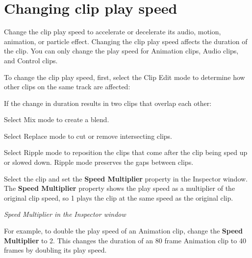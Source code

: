 \chapter{Changing clip play speed}
\hypertarget{md__library_2_package_cache_2com_8unity_8timeline_0d1_87_86_2_documentation_0i_2clp__speed}{}\label{md__library_2_package_cache_2com_8unity_8timeline_0d1_87_86_2_documentation_0i_2clp__speed}
\label{md__library_2_package_cache_2com_8unity_8timeline_0d1_87_86_2_documentation_0i_2clp__speed_autotoc_md1126}%
%
 Change the clip play speed to accelerate or decelerate its audio, motion, animation, or particle effect. Changing the clip play speed affects the duration of the clip. You can only change the play speed for Animation clips, Audio clips, and Control clips.

To change the clip play speed, first, select the Clip Edit mode to determine how other clips on the same track are affected\+:


\begin{DoxyItemize}
\item If the change in duration results in two clips that overlap each other\+:
\begin{DoxyItemize}
\item Select Mix mode to create a blend.
\item Select Replace mode to cut or remove intersecting clips.
\end{DoxyItemize}
\item Select Ripple mode to reposition the clips that come after the clip being sped up or slowed down. Ripple mode preserves the gaps between clips.
\end{DoxyItemize}

Select the clip and set the {\bfseries{Speed Multiplier}} property in the Inspector window. The {\bfseries{Speed Multiplier}} property shows the play speed as a multiplier of the original clip speed, so 1 plays the clip at the same speed as the original clip.



{\itshape Speed Multiplier in the Inspector window}

For example, to double the play speed of an Animation clip, change the {\bfseries{Speed Multiplier}} to 2. This changes the duration of an 80 frame Animation clip to 40 frames by doubling its play speed.

